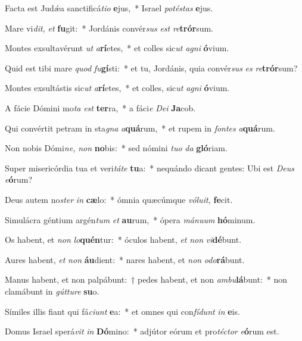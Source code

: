 \item Facta est Judǽa sanctificá\textit{tio} \textbf{e}jus,~* Israel \textit{potéstas} \textbf{e}jus.
\item Mare vi\textit{dit,} \textit{et} \textbf{fu}git:~* Jordánis convér\textit{sus} \textit{est} \textit{re}\textbf{trór}sum.
\item Montes exsultavérunt \textit{ut} \textit{a}\textbf{rí}etes,~* et colles sic\textit{ut} \textit{agni} \textbf{ó}vium.
\item Quid est tibi mare \textit{quod} \textit{fu}\textbf{gí}sti:~* et tu, Jordánis, quia convér\textit{sus} \textit{es} \textit{re}\textbf{trór}sum?
\item Montes exsultástis sic\textit{ut} \textit{a}\textbf{rí}etes,~* et colles, sic\textit{ut} \textit{agni} \textbf{ó}vium.
\item A fácie Dómini mo\textit{ta} \textit{est} \textbf{ter}ra,~* a fáci\textit{e} \textit{Dei} \textbf{Ja}cob.
\item Qui convértit petram in sta\textit{gna} \textit{a}\textbf{quá}rum,~* et rupem in \textit{fontes} \textit{a}\textbf{quá}rum.
\item Non nobis Dómi\textit{ne,} \textit{non} \textbf{no}bis:~* sed nómini \textit{tuo} \textit{da} \textbf{gló}riam.
\item Super misericórdia tua et veri\textit{táte} \textbf{tu}a:~* nequándo dicant gentes: Ubi est \textit{Deus} \textit{e}\textbf{ó}rum?
\item Deus autem no\textit{ster} \textit{in} \textbf{cæ}lo:~* ómnia quæcúmque \textit{vóluit,} \textbf{fe}cit.
\item Simulácra géntium argén\textit{tum} \textit{et} \textbf{au}rum,~* ópera \textit{mánuum} \textbf{hó}minum.
\item Os habent, et \textit{non} \textit{lo}\textbf{quén}tur:~* óculos habent, \textit{et} \textit{non} \textit{vi}\textbf{dé}bunt.
\item Aures habent, \textit{et} \textit{non} \textbf{áu}dient:~* nares habent, et \textit{non} \textit{odo}\textbf{rá}bunt.
\item Manus habent, et non palpábunt:~† pedes habent, et non \textit{ambu}\textbf{lá}bunt:~* non clamábunt in \textit{gútture} \textbf{su}o.
\item Símiles illis fiant qui fá\textit{ciunt} \textbf{e}a:~* et o\-mnes qui con\textit{fídunt} \textit{in} \textbf{e}is.
\item Domus Israel sperá\textit{vit} \textit{in} \textbf{Dó}mino:~* adjútor eórum et pro\textit{téctor} \textit{e}\textbf{ó}rum est.
